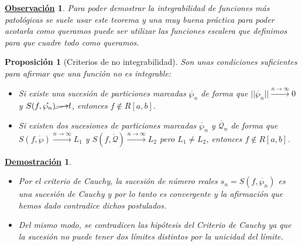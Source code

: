\documentclass[10pt,a4paper,openright]{book}
\theoremstyle{break}
\newtheorem{prop}{Proposición}[chapter]
\newtheorem*{demo}{\underline{Demostración}}
\newtheorem{obs}{\underline{Observación}}[chapter]
\begin{document}
\begin{obs}
Para poder demostrar la integrabilidad de funciones más patológicas se suele usar este teorema y una muy buena práctica para poder acotarla como queramos puede ser utilizar las funciones escalera que definimos para que cuadre todo como queramos.
\end{obs}

\begin{prop}[Criterios de no integrabilidad]
Son unas condiciones suficientes para afirmar que una función no es integrable:
\begin{itemize}
\item Si existe una sucesión de particiones marcadas $\mathring{\wp_n}$ de forma que $||\mathring{\wp_n}||\xrightarrow{n\rightarrow \infty} 0 $ y $S(f,\mathring{\wp_n})\cancel{\longrightarrow} l$, entonces $f\notin R[a,b]$.

\item Si existen dos sucesiones de particiones marcadas $\mathring{\wp_n}$ y $\mathring{\mathcal{Q}_n}$ de forma que $S(f,\mathring{\wp})\xrightarrow{n\rightarrow \infty} L_1$ y $S(f,\mathring{\mathcal{Q}})\xrightarrow{n\rightarrow \infty} L_2$ pero $L_1\neq L_2$, entonces $f\notin R[a,b]$.
\end{itemize}
\end{prop}
\begin{demo}
\begin{itemize}
\item Por el criterio de Cauchy, la sucesión de número reales $s_n = S(f,\mathring{\wp_n})$ es una sucesión de Cauchy y por lo tanto es convergente y la afirmación que hemos dado contradice dichos postulados.
\item Del mismo modo, se contradicen las hipótesis del Criterio de Cauchy ya que la sucesión no puede tener dos límites distintos por la unicidad del límite.
\end{itemize}
\end{demo}
\end{document}

